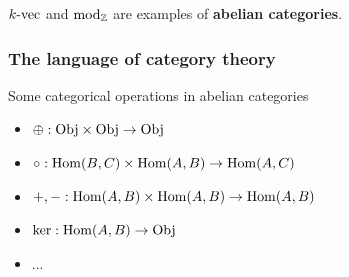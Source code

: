 \begin{frame}[fragile]
  $k\mathrm{\text{-}vec}$ and $\mathrm{mod}_{\mathbb{Z}}$ are examples of \textbf{abelian categories}.
  \pause
 \frametitle{The language of category theory}
 \begin{block}{Some categorical operations in abelian categories}
  \begin{itemize}
   \pause
   \item $\oplus: \mathrm{Obj} \times \mathrm{Obj} \rightarrow \mathrm{Obj}$
   \pause
   \item $\circ: \operatorname{Hom}(B,C) \times \operatorname{Hom}(A,B) \rightarrow \operatorname{Hom}(A,C)$
   \pause
   \item $+,-: \operatorname{Hom}(A,B) \times \operatorname{Hom}(A,B) \rightarrow \operatorname{Hom}(A,B)$
   \pause
   \item {$\operatorname{ker}: \operatorname{Hom}(A,B) \rightarrow \mathrm{Obj}$}
   \pause
   \item ...
  \end{itemize}
 \end{block}
\end{frame}

